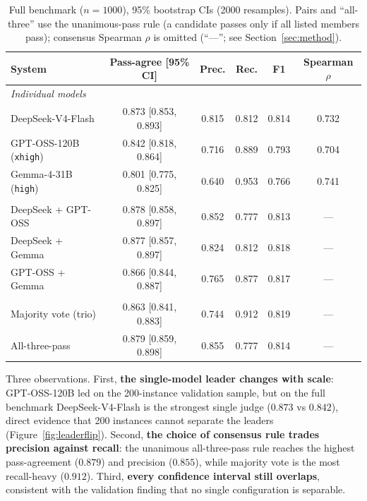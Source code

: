 \documentclass{article}
\begin{document}
\begin{table}[t]
  \caption{Full benchmark ($n=1000$), 95\% bootstrap CIs (2000 resamples). Pairs
    and ``all-three'' use the unanimous-pass rule (a candidate passes only if all
    listed members pass); consensus Spearman $\rho$ is omitted (``---''; see
    Section~\ref{sec:method}).}
  \label{tab:full}
  \begin{center}
    \begin{small}
      \begin{tabular}{lccccc}
        \toprule
        System & Pass-agree [95\% CI] & Prec. & Rec. & F1 & Spearman $\rho$ \\
        \midrule
        \multicolumn{6}{l}{\emph{Individual models}} \\
        DeepSeek-V4-Flash      & 0.873 [0.853, 0.893] & 0.815 & 0.812 & 0.814 & 0.732 \\
        GPT-OSS-120B (\texttt{xhigh}) & 0.842 [0.818, 0.864] & 0.716 & 0.889 & 0.793 & 0.704 \\
        Gemma-4-31B (\texttt{high})   & 0.801 [0.775, 0.825] & 0.640 & 0.953 & 0.766 & 0.741 \\
        \addlinespace
        \multicolumn{6}{l}{\emph{Pairs (unanimous pass)}} \\
        DeepSeek + GPT-OSS     & 0.878 [0.858, 0.897] & 0.852 & 0.777 & 0.813 & --- \\
        DeepSeek + Gemma       & 0.877 [0.857, 0.897] & 0.824 & 0.812 & 0.818 & --- \\
        GPT-OSS + Gemma        & 0.866 [0.844, 0.887] & 0.765 & 0.877 & 0.817 & --- \\
        \addlinespace
        \multicolumn{6}{l}{\emph{Combined}} \\
        Majority vote (trio)   & 0.863 [0.841, 0.883] & 0.744 & 0.912 & 0.819 & --- \\
        All-three-pass         & 0.879 [0.859, 0.898] & 0.855 & 0.777 & 0.814 & --- \\
        \bottomrule
      \end{tabular}
    \end{small}
  \end{center}
  \vskip -0.1in
\end{table}

Three observations. First, \textbf{the single-model leader changes with scale}:
GPT-OSS-120B led on the 200-instance validation sample, but on the full benchmark
DeepSeek-V4-Flash is the strongest single judge ($0.873$ vs $0.842$), direct
evidence that 200 instances cannot separate the leaders (Figure~\ref{fig:leaderflip}).
Second, \textbf{the choice of consensus rule trades precision against recall}: the
unanimous all-three-pass rule reaches the highest pass-agreement ($0.879$) and
precision ($0.855$), while majority vote is the most recall-heavy ($0.912$). Third,
\textbf{every confidence interval still overlaps}, consistent with the validation
finding that no single configuration is separable.
\end{document}
